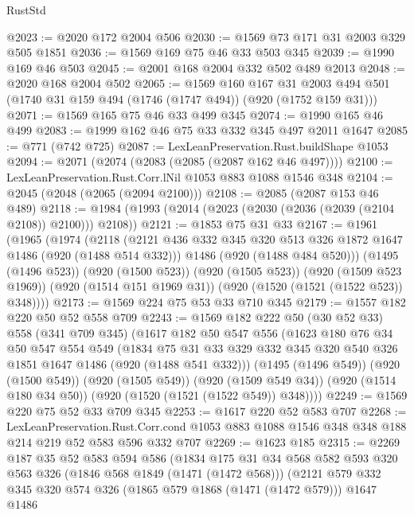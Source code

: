 \begin{lexlean}{RustStd}
\begin{coremodule}
@2023 := @2020 @172 @2004 @506
@2030 := @1569 @73 @171 @31 @2003 @329 @505 @1851
@2036 := @1569 @169 @75 @46 @33 @503 @345
@2039 := @1990 @169 @46 @503
@2045 := @2001 @168 @2004 @332 @502 @489 @2013
@2048 := @2020 @168 @2004 @502
@2065 := @1569
    @160
    @167
    @31
    @2003
    @494
    @501
    (@1740 @31 @159 @494 (@1746 (@1747 @494)) (@920 (@1752 @159 @31)))
@2071 := @1569 @165 @75 @46 @33 @499 @345
@2074 := @1990 @165 @46 @499
@2083 := @1999 @162 @46 @75 @33 @332 @345 @497 @2011 @1647
@2085 := @771 (@742 @725)
@2087 := LexLeanPreservation.Rust.buildShape @1053
@2094 := @2071 (@2074 (@2083 (@2085 (@2087 @162 @46 @497))))
@2100 := LexLeanPreservation.Rust.Corr.lNil @1053 @883 @1088 @1546 @348
@2104 := @2045 (@2048 (@2065 (@2094 @2100)))
@2108 := @2085 (@2087 @153 @46 @489)
@2118 := @1984 (@1993 (@2014 (@2023 (@2030 (@2036 (@2039 (@2104 @2108)) @2100))) @2108))
@2121 := @1853 @75 @31 @33
@2167 := @1961
    (@1965
      (@1974
        (@2118
          (@2121 @436 @332 @345 @320 @513 @326 @1872 @1647 @1486 (@920 (@1488 @514 @332)))
          @1486
          (@920 (@1488 @484 @520)))
        (@1495 (@1496 @523))
        (@920 (@1500 @523))
        (@920 (@1505 @523))
        (@920 (@1509 @523 @1969))
        (@920 (@1514 @151 @1969 @31))
        (@920 (@1520 (@1521 (@1522 @523)) @348))))
@2173 := @1569 @224 @75 @53 @33 @710 @345
@2179 := @1557 @182 @220 @50 @52 @558 @709
@2243 := @1569
    @182
    @222
    @50
    (@30 @52 @33)
    @558
    (@341 @709 @345)
    (@1617
      @182
      @50
      @547
      @556
      (@1623
        @180
        @76
        @34
        @50
        @547
        @554
        @549
        (@1834 @75 @31 @33 @329 @332 @345 @320 @540 @326 @1851 @1647 @1486 (@920 (@1488 @541 @332)))
        (@1495 (@1496 @549))
        (@920 (@1500 @549))
        (@920 (@1505 @549))
        (@920 (@1509 @549 @34))
        (@920 (@1514 @180 @34 @50))
        (@920 (@1520 (@1521 (@1522 @549)) @348))))
@2249 := @1569 @220 @75 @52 @33 @709 @345
@2253 := @1617 @220 @52 @583 @707
@2268 := LexLeanPreservation.Rust.Corr.cond
    @1053
    @883
    @1088
    @1546
    @348
    @348
    @188
    @214
    @219
    @52
    @583
    @596
    @332
    @707
@2269 := @1623 @185
@2315 := @2269
    @187
    @35
    @52
    @583
    @594
    @586
    (@1834
      @175
      @31
      @34
      @568
      @582
      @593
      @320
      @563
      @326
      (@1846 @568 @1849 (@1471 (@1472 @568)))
      (@2121
        @579
        @332
        @345
        @320
        @574
        @326
        (@1865 @579 @1868 (@1471 (@1472 @579)))
        @1647
        @1486

\end{coremodule}
\end{lexlean}
